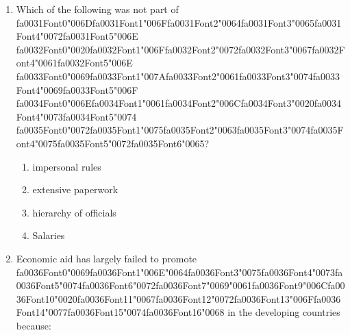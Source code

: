 \documentclass[12pt]{article}
\begin{document}
\begin{enumerate}[label=\arabic*.]
\begin{enumerate}[label=(\alph*)]
    \item they have a deep-rooted sense of ineffectiveness and are striving for control
    \item they are in pursuit of the 'perfect' body, fuelled by images of beauty
    \item they perceive a part of their body as stigmatizing, in relation to a cultural ideal
    \item their male partners pressurize them to look like supermodels
\end{enumerate}
\item Which of the following was not part of {\csname fa0031Font0\endcsname\char"006D}{\csname fa0031Font1\endcsname\char"006F}{\csname fa0031Font2\endcsname\char"0064}{\csname fa0031Font3\endcsname\char"0065}{\csname fa0031Font4\endcsname\char"0072}{\csname fa0031Font5\endcsname\char"006E} {\csname fa0032Font0\endcsname\char"0020}{\csname fa0032Font1\endcsname\char"006F}{\csname fa0032Font2\endcsname\char"0072}{\csname fa0032Font3\endcsname\char"0067}{\csname fa0032Font4\endcsname\char"0061}{\csname fa0032Font5\endcsname\char"006E} {\csname fa0033Font0\endcsname\char"0069}{\csname fa0033Font1\endcsname\char"007A}{\csname fa0033Font2\endcsname\char"0061}{\csname fa0033Font3\endcsname\char"0074}{\csname fa0033Font4\endcsname\char"0069}{\csname fa0033Font5\endcsname\char"006F} {\csname fa0034Font0\endcsname\char"006E}{\csname fa0034Font1\endcsname\char"0061}{\csname fa0034Font2\endcsname\char"006C}{\csname fa0034Font3\endcsname\char"0020}{\csname fa0034Font4\endcsname\char"0073}{\csname fa0034Font5\endcsname\char"0074} {\csname fa0035Font0\endcsname\char"0072}{\csname fa0035Font1\endcsname\char"0075}{\csname fa0035Font2\endcsname\char"0063}{\csname fa0035Font3\endcsname\char"0074}{\csname fa0035Font4\endcsname\char"0075}{\csname fa0035Font5\endcsname\char"0072}{\csname fa0035Font6\endcsname\char"0065}?
\begin{enumerate}[label=(\alph*)]
    \item impersonal rules
    \item extensive paperwork
    \item hierarchy of officials
    \item Salaries
\end{enumerate}
\item Economic aid has largely failed to promote {\csname fa0036Font0\endcsname\char"0069}{\csname fa0036Font1\endcsname\char"006E}{\char"0064}{\csname fa0036Font3\endcsname\char"0075}{\csname fa0036Font4\endcsname\char"0073}{\csname fa0036Font5\endcsname\char"0074}{\csname fa0036Font6\endcsname\char"0072}{\csname fa0036Font7\endcsname\char"0069}{\char"0061}{\csname fa0036Font9\endcsname\char"006C}{\csname fa0036Font10\endcsname\char"0020}{\csname fa0036Font11\endcsname\char"0067}{\csname fa0036Font12\endcsname\char"0072}{\csname fa0036Font13\endcsname\char"006F}{\csname fa0036Font14\endcsname\char"0077}{\csname fa0036Font15\endcsname\char"0074}{\csname fa0036Font16\endcsname\char"0068} in the developing countries because:

\end{enumerate}
\end{document}
